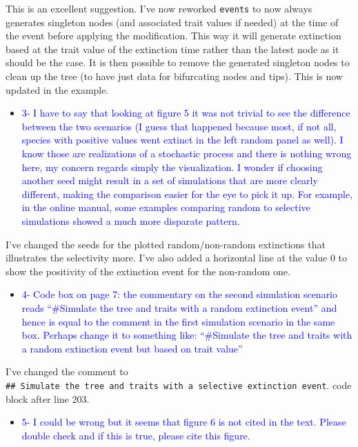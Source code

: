 \documentclass[
]{article}
\providecommand{\tightlist}{%
  \setlength{\itemsep}{0pt}\setlength{\parskip}{0pt}}
\begin{document}
This is an excellent suggestion. I've now reworked \texttt{events} to
now always generates singleton nodes (and associated trait values if
needed) at the time of the event before applying the modification. This
way it will generate extinction based at the trait value of the
extinction time rather than the latest node as it should be the case. It
is then possible to remove the generated singleton nodes to clean up the
tree (to have just data for bifurcating nodes and tips). This is now
updated in the example.

\begin{itemize}
\tightlist
\item
  \textcolor{blue}{3- I have to say that looking at figure 5 it was not trivial to see
  the difference between the two scenarios (I guess that happened
  because most, if not all, species with positive values went extinct in
  the left random panel as well). I know those are realizations of a
  stochastic process and there is nothing wrong here, my concern regards
  simply the visualization. I wonder if choosing another seed might
  result in a set of simulations that are more clearly different, making
  the comparison easier for the eye to pick it up. For example, in the
  online manual, some examples comparing random to selective simulations
  showed a much more disparate pattern.}
\end{itemize}

I've changed the seeds for the plotted random/non-random extinctions
that illustrates the selectivity more. I've also added a horizontal line
at the value 0 to show the positivity of the extinction event for the
non-random one.

\begin{itemize}
\tightlist
\item
  \textcolor{blue}{4- Code box on page 7: the commentary on the second simulation
  scenario reads ``\#Simulate the tree and traits with a random
  extinction event'' and hence is equal to the comment in the first
  simulation scenario in the same box. Perhaps change it to something
  like: ``\#Simulate the tree and traits with a random extinction event
  but based on trait value''}
\end{itemize}

I've changed the comment to
\texttt{\#\#\ Simulate\ the\ tree\ and\ traits\ with\ a\ selective\ extinction\ event}.
code block after line 203.

\begin{itemize}
\tightlist
\item
  \textcolor{blue}{5- I could be wrong but it seems that figure 6 is not cited in the
  text. Please double check and if this is true, please cite this
  figure. }
\end{itemize}
\end{document}
